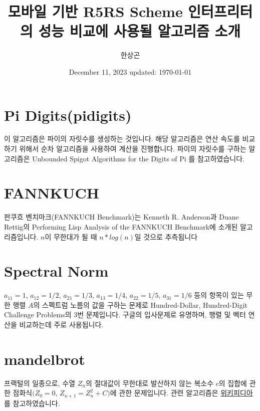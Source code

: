 \documentclass[12pt]{article}
\title{모바일 기반 R5RS Scheme 인터프리터의 성능 비교에 사용될 알고리즘 소개}
\author{한상곤}
\date{December 11, 2023 updated: \today}
\begin{document}
\maketitle

\section{Pi Digits(pidigits)}\label{pi-digitspidigits}
이 알고리즘은 파이의 자릿수를 생성하는 것입니다. 해당 알고리즘은 연산 속도를 비교하기 위해서 순차 알고리즘을 사용하여 계산을 진행합니다. 파이의 자릿수를 구하는 알고리즘은 Unbounded Spigot Algorithms for the Digits of Pi \cite{gibbons2006unbounded}를 참고하였습니다.




\section{FANNKUCH}\label{fannkuch}

판쿠흐 벤치마크(FANNKUCH Benchmark)는 Kenneth R. Anderson과 Duane Rettig의 Performing Lisp Analysis of the FANNKUCH Benchmark\cite{anderson1994performing}에 소개된 알고리즘입니다. $n$이 무한대가 될 때 $n*log(n)$일 것으로 추측됩니다



\section{Spectral Norm}\label{spectral-norm}

$a_{11}=1$, $a_{12}=1/2$, $a_{21}=1/3$, $a_{13}=1/4$, $a_{22}=1/5$, $a_{31}=1/6$ 등의 항목이 있는 무한 행렬 $A$의 스펙트럼 노름의 값을 구하는 문제로 Hundred-Dollar, Hundred-Digit Challenge Problems의 3번 문제\cite{keithbriggs2002solution}입니다. 구글의 입사문제로 유명하며, 행렬 및 벡터 연산을 비교하는데 주로 사용됩니다.



\section{mandelbrot}\label{mandelbrot}

프랙털의 일종으로, 수열 ${Z_n}$의 절대값이 무한대로 발산하지 않는 복소수 $c$의 집합에 관한 점화식$(Z_0 = 0$, $Z_{n+1} = Z_{n}^2 + C)$에 관한 문제입니다. 관련 알고리즘은 \href{https://en.wikipedia.org/wiki/Mandelbrot_set}{위키피디아}를 참고하였습니다.




\end{document}
